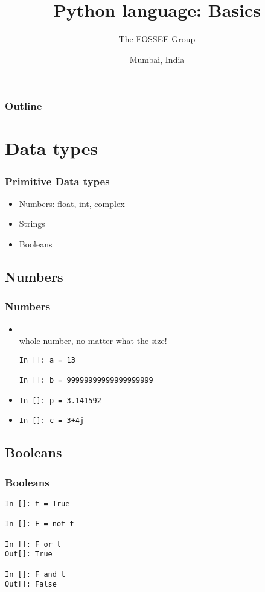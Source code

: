 \documentclass[14pt,compress]{beamer}
\title[Basic Python]{Python language: Basics}
\author[FOSSEE Team] {The FOSSEE Group}
\institute[FOSSEE -- IITB] {Department of Aerospace Engineering\\IIT Bombay}
\date[] {Mumbai, India}
\begin{document}
\begin{frame}
  \titlepage
\end{frame}

\begin{frame}
  \frametitle{Outline}
  \tableofcontents
\end{frame}

\section{Data types}

\begin{frame}
  \frametitle{Primitive Data types}
  \begin{itemize}
    \item Numbers: float, int, complex
    \item Strings
    \item Booleans
  \end{itemize}
\end{frame}

\subsection{Numbers}
\begin{frame}[fragile]
  \frametitle{Numbers}
  \begin{itemize}
    \item {}\\ whole number, no matter what the size!
  \begin{lstlisting}
In []: a = 13

In []: b = 99999999999999999999
  \end{lstlisting}
    \item {}
  \begin{lstlisting}
In []: p = 3.141592
  \end{lstlisting}
    \item {}
  \begin{lstlisting}
In []: c = 3+4j
  \end{lstlisting}
  \end{itemize}
\end{frame}

\subsection{Booleans}
\begin{frame}[fragile]
  \frametitle{Booleans}
  \begin{lstlisting}
In []: t = True

In []: F = not t

In []: F or t
Out[]: True

In []: F and t
Out[]: False
  \end{lstlisting}
\end{frame}
\end{document}
